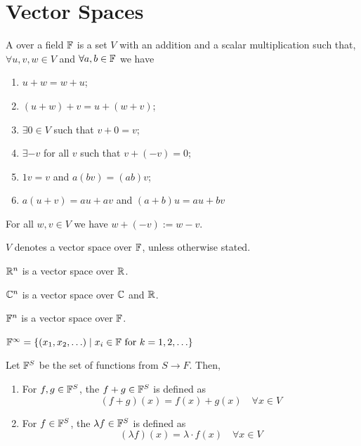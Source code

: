 \section{Vector Spaces}
\begin{definition}
    A  over a field $\mathbb{F}$ is a set $V$ with an addition and a scalar multiplication such that, $\forall u,v,w \in V$
    and $\forall a,b \in \mathbb{F}$ we have
    \begin{enumerate}
        \item $u+w=w+u$;
        \item $(u+w)+v=u+(w+v)$;
        \item $\exists 0 \in V$ such that $v+0=v$;
        \item $\exists -v$ for all $v$ such that $v+(-v)=0$;
        \item $1v=v$ and $a(bv)=(ab)v$;
        \item $a(u+v)=au+av$ and $(a+b)u=au+bv$
    \end{enumerate}
\end{definition}

\begin{notation}
    For all $w,v \in V$ we have $w+(-v) := w-v$.
\end{notation}

\begin{notation}
    $V$ denotes a vector space over $\mathbb{F}$, unless otherwise stated.
\end{notation}

\begin{example}
$\mathbb{R}^n$ is a vector space over $\mathbb{R}$. 
\end{example}

\begin{example}
$\mathbb{C}^n$ is a vector space over $\mathbb{C}$ and $\mathbb{R}$.
\end{example}
    
\begin{example}
$\mathbb{F}^n$ is a vector space over $\mathbb{F}$.
\end{example}

\begin{notation}
    $\mathbb{F}^{\infty} = \{(x_1,x_2,\ldots) \mid x_i \in \mathbb{F} \text{ for } k = 1,2,\ldots\}$
\end{notation}

\begin{notation}
    Let $\mathbb{F}^S$ be the set of functions from $S \to F$. Then,
    \begin{enumerate}
        \item For $f,g \in \mathbb{F}^S$, the  $f+g \in \mathbb{F}^S$ is defined as 
                    \[ (f+g)(x) = f(x)+g(x) \quad \forall x \in V \]
        \item For $f \in \mathbb{F}^S$, the  $\lambda f \in \mathbb{F}^S$ is defined as
                    \[ (\lambda f)(x) = \lambda \cdot f(x) \quad \forall x \in V \]
    \end{enumerate}
\end{notation}

